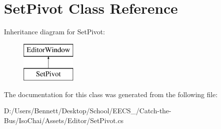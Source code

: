 \hypertarget{class_set_pivot}{}\section{Set\+Pivot Class Reference}
\label{class_set_pivot}
Inheritance diagram for Set\+Pivot\+:\begin{figure}[H]
\begin{center}
\leavevmode
\includegraphics[height=2.000000cm]{class_set_pivot}
\end{center}
\end{figure}


The documentation for this class was generated from the following file\+:\begin{DoxyCompactItemize}
\item 
D\+:/\+Users/\+Bennett/\+Desktop/\+School/\+E\+E\+C\+S\+\_/\+Catch-\/the-\/\+Bus/\+Iso\+Chai/\+Assets/\+Editor/Set\+Pivot.\+cs\end{DoxyCompactItemize}

